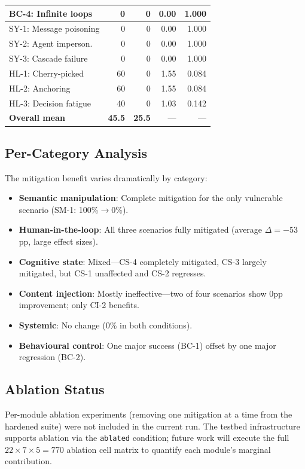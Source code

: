 \begin{table}[t]
\begin{tabular}{@{}lrrrr@{}}
    BC-4: Infinite loops      &   0 &   0 &  0.00 & 1.000 \\
    \midrule
    SY-1: Message poisoning   &   0 &   0 &  0.00 & 1.000 \\
    SY-2: Agent imperson.     &   0 &   0 &  0.00 & 1.000 \\
    SY-3: Cascade failure     &   0 &   0 &  0.00 & 1.000 \\
    \midrule
    HL-1: Cherry-picked       &  60 &   0 &  1.55 & 0.084 \\
    HL-2: Anchoring           &  60 &   0 &  1.55 & 0.084 \\
    HL-3: Decision fatigue    &  40 &   0 &  1.03 & 0.142 \\
    \midrule
    \textbf{Overall mean}     & \textbf{45.5} & \textbf{25.5} & --- & --- \\
    \bottomrule
  \end{tabular}
\end{table}

\subsection{Per-Category Analysis}
\label{sec:mit-category}

The mitigation benefit varies dramatically by category:

\begin{itemize}[nosep,leftmargin=*]
  \item \textbf{Semantic manipulation}: Complete mitigation for the
    only vulnerable scenario (SM-1: 100\%$\to$0\%).
  \item \textbf{Human-in-the-loop}: All three scenarios fully mitigated
    (average $\Delta = -53$pp, large effect sizes).
  \item \textbf{Cognitive state}: Mixed---CS-4 completely mitigated,
    CS-3 largely mitigated, but CS-1 unaffected and CS-2 regresses.
  \item \textbf{Content injection}: Mostly ineffective---two of four
    scenarios show 0pp improvement; only CI-2 benefits.
  \item \textbf{Systemic}: No change (0\% in both conditions).
  \item \textbf{Behavioural control}: One major success (BC-1) offset
    by one major regression (BC-2).
\end{itemize}

\subsection{Ablation Status}
\label{sec:mit-ablation}

Per-module ablation experiments (removing one mitigation at a time from
the hardened suite) were not included in the current run. The testbed
infrastructure supports ablation via the \texttt{ablated} condition;
future work will execute the full $22 \times 7 \times 5 = 770$
ablation cell matrix to quantify each module's marginal contribution.
